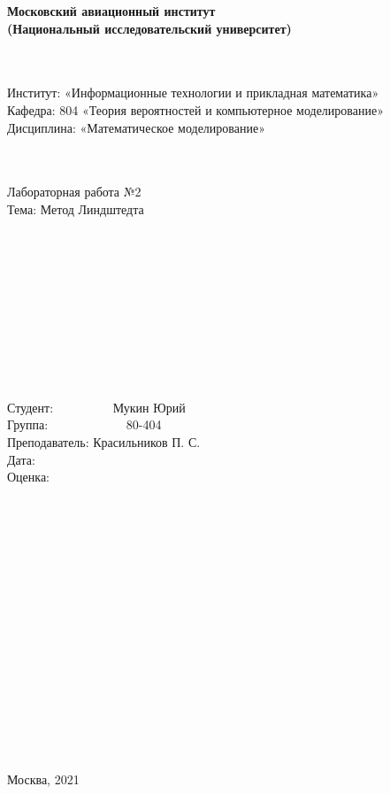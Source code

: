 \documentclass[12pt]{article}
\begin{document}
    \begin{center}
        \textbf{Московский авиационный институт} \\
        \textbf{(Национальный исследовательский университет)}
    \end{center} 
    ~\\
    ~\\
    Институт: «Информационные технологии и прикладная математика» \\
    Кафедра: 804 «Теория вероятностей и компьютерное моделирование» \\
    Дисциплина: «Математическое моделирование»  
    ~\\
    ~\\
    ~\\
    \begin{center}
        Лабораторная работа №2 \\
        Тема: Метод Линдштедта
    \end{center}
    ~\\
    ~\\
    ~\\
    ~\\
    ~\\
    ~\\
    ~\\
    ~\\
    ~\\
    \begin{flushright}
        Студент: ~~~~~~~~~Мукин Юрий~~~~~~~~~~~\\
        Группа: ~~~~~~~~~~~~80-404~~~~~~~~~~~~~~~~~~~\\
        Преподаватель: Красильников П. С.\\
        Дата: ~~~~~~~~~~~~~~~~~~~~~~~~~~~~~~~~~~~~~~~~~~~\\
        Оценка:~~~~~~~~~~~~~~~~~~~~~~~~~~~~~~~~~~~~~~~~~\\
    \end{flushright}
    ~\\
    ~\\
    ~\\
    ~\\
    ~\\
    ~\\
    ~\\
    ~\\
    ~\\
    ~\\
    ~\\
    ~\\
    ~\\
    ~\\
    ~\\
    \begin{center}
        Москва, 2021
    \end{center}
    \pagestyle{empty}
    \newpage
\end{document}
